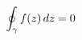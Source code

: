 \documentclass[preview]{standalone}
\begin{document}
\begin{align*}
\special{dvisvgm:raw <g id='unique000'>}\oint_{\gamma} f(z)\,dz = 0\special{dvisvgm:raw </g>}
\end{align*}
\end{document}
